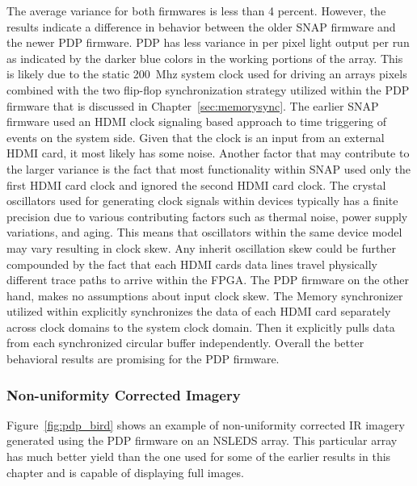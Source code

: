             The average variance for both firmwares is less than 4 percent. However, the results indicate a difference in behavior between the older SNAP firmware and the newer PDP firmware. PDP has less variance in per pixel light output per run as indicated by the darker blue colors in the working portions of the array. This is likely due to the static \mbox{200 Mhz} system clock used for driving an arrays pixels combined with the two flip-flop synchronization strategy utilized within the PDP firmware that is discussed in Chapter~\ref{sec:memorysync}. The earlier SNAP firmware used an HDMI clock signaling based approach to time triggering of events on the system side. Given that the clock is an input from an external HDMI card, it most likely has some noise. Another factor that may contribute to the larger variance is the fact that most functionality within SNAP used only the first HDMI card clock and ignored the second HDMI card clock. The crystal oscillators used for generating clock signals within devices typically has a finite precision due to various contributing factors such as thermal noise, power supply variations, and aging\cite{Naval2002}. This means that oscillators within the same device model may vary resulting in clock skew. Any inherit oscillation skew could be further compounded by the fact that each HDMI cards data lines travel physically different trace paths to arrive within the FPGA. The PDP firmware on the other hand, makes no assumptions about input clock skew. The Memory synchronizer utilized within explicitly synchronizes the data of each HDMI card separately across clock domains to the system clock domain. Then it explicitly pulls data from each synchronized circular buffer independently. Overall the better behavioral results are promising for the PDP firmware.

        \subsubsection{Non-uniformity Corrected Imagery}
            Figure~\ref{fig:pdp_bird} shows an example of non-uniformity corrected IR imagery generated using the PDP firmware on an NSLEDS array. This particular array has much better yield than the one used for some of the earlier results in this chapter and is capable of displaying full images.

